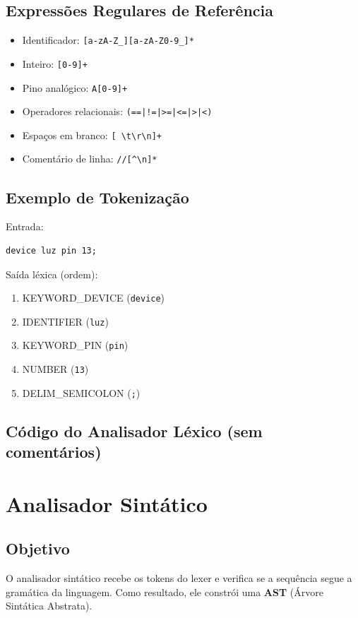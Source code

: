 \documentclass[12pt,a4paper]{article}
\begin{document}
\subsection{Expressões Regulares de Referência}
\begin{itemize}
  \item Identificador: \texttt{[a-zA-Z\_][a-zA-Z0-9\_]*}
  \item Inteiro: \texttt{[0-9]+}
  \item Pino analógico: \texttt{A[0-9]+}
  \item Operadores relacionais: \texttt{(==|!=|>=|<=|>|<)}
  \item Espaços em branco: \texttt{[ \textbackslash t\textbackslash r\textbackslash n]+}
  \item Comentário de linha: \texttt{//[^\textbackslash n]*}
\end{itemize}

\subsection{Exemplo de Tokenização}
Entrada:
\begin{lstlisting}[style=homescript]
device luz pin 13;
\end{lstlisting}

Saída léxica (ordem):
\begin{enumerate}[label=\arabic*.]
  \item KEYWORD\_DEVICE (\texttt{device})
  \item IDENTIFIER (\texttt{luz})
  \item KEYWORD\_PIN (\texttt{pin})
  \item NUMBER (\texttt{13})
  \item DELIM\_SEMICOLON (\texttt{;})
\end{enumerate}

\subsection{Código do Analisador Léxico (sem comentários)}


\section{Analisador Sintático}

\subsection{Objetivo}
O analisador sintático recebe os tokens do lexer e verifica se a sequência segue a gramática da linguagem. Como resultado, ele constrói uma \textbf{AST} (Árvore Sintática Abstrata).
\end{document}
